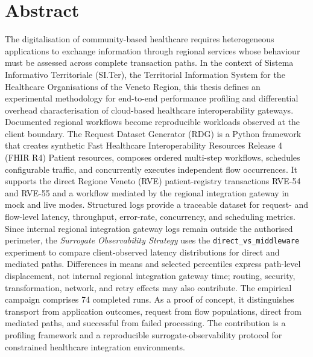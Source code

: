 \cleardoublepage
{}
{}
\begingroup
\setlength{\emergencystretch}{2em}
\let\clearpage\relax
\let\cleardoublepage\relax
\chapter*{Abstract}
\noindent The digitalisation of community-based healthcare requires heterogeneous
applications to exchange information through regional services whose behaviour
must be assessed across complete transaction paths. In the context of
Sistema Informativo Territoriale (SI.Ter), the Territorial Information System
for the Healthcare Organisations of the Veneto Region, this thesis defines an
experimental methodology for end-to-end
performance profiling and differential overhead characterisation of cloud-based
healthcare interoperability gateways. Documented regional workflows become
reproducible workloads observed at the client boundary. The Request Dataset
Generator (RDG) is a Python framework that creates synthetic Fast Healthcare
Interoperability Resources Release 4 (FHIR R4) Patient resources, composes ordered
multi-step workflows, schedules configurable traffic, and concurrently executes
independent flow occurrences. It supports the direct Regione Veneto (RVE)
patient-registry transactions RVE-54 and RVE-55 and a workflow mediated by the
regional integration gateway
in mock and live
modes. Structured logs provide a traceable dataset for request- and flow-level
latency, throughput, error-rate, concurrency, and scheduling metrics. Since
internal regional integration gateway logs remain outside the authorised perimeter, the
\emph{Surrogate Observability Strategy} uses the
\texttt{direct\_\allowbreak vs\_\allowbreak middleware} experiment to compare
client-observed latency distributions for direct and mediated paths. Differences
in means and selected percentiles express path-level displacement, not
internal regional integration gateway time; routing, security, transformation, network, and retry
effects may also contribute. The empirical campaign comprises 74 completed runs. As a proof of concept, it
distinguishes transport from application outcomes, request from flow
populations, direct from mediated paths, and successful from failed processing.
The contribution is a profiling framework and a reproducible
surrogate-observability protocol for constrained healthcare integration
environments.
\endgroup
\vfill
